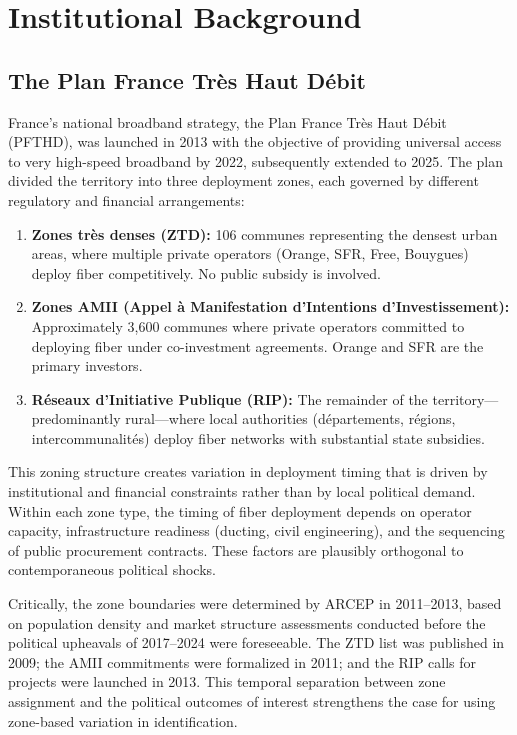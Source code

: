 \documentclass[12pt]{article}
\begin{document}
\section{Institutional Background}\label{sec:background}

\subsection{The Plan France Tr\`es Haut D\'ebit}

France's national broadband strategy, the Plan France Tr\`es Haut D\'ebit (PFTHD), was launched in 2013 with the objective of providing universal access to very high-speed broadband by 2022, subsequently extended to 2025. The plan divided the territory into three deployment zones, each governed by different regulatory and financial arrangements:

\begin{enumerate}
\item \textbf{Zones tr\`es denses (ZTD):} 106 communes representing the densest urban areas, where multiple private operators (Orange, SFR, Free, Bouygues) deploy fiber competitively. No public subsidy is involved.

\item \textbf{Zones AMII (Appel \`a Manifestation d'Intentions d'Investissement):} Approximately 3,600 communes where private operators committed to deploying fiber under co-investment agreements. Orange and SFR are the primary investors.

\item \textbf{R\'eseaux d'Initiative Publique (RIP):} The remainder of the territory---predominantly rural---where local authorities (d\'epartements, r\'egions, intercommunalit\'es) deploy fiber networks with substantial state subsidies.
\end{enumerate}

This zoning structure creates variation in deployment timing that is driven by institutional and financial constraints rather than by local political demand. Within each zone type, the timing of fiber deployment depends on operator capacity, infrastructure readiness (ducting, civil engineering), and the sequencing of public procurement contracts. These factors are plausibly orthogonal to contemporaneous political shocks.

Critically, the zone boundaries were determined by ARCEP in 2011--2013, based on population density and market structure assessments conducted before the political upheavals of 2017--2024 were foreseeable. The ZTD list was published in 2009; the AMII commitments were formalized in 2011; and the RIP calls for projects were launched in 2013. This temporal separation between zone assignment and the political outcomes of interest strengthens the case for using zone-based variation in identification.
\end{document}
